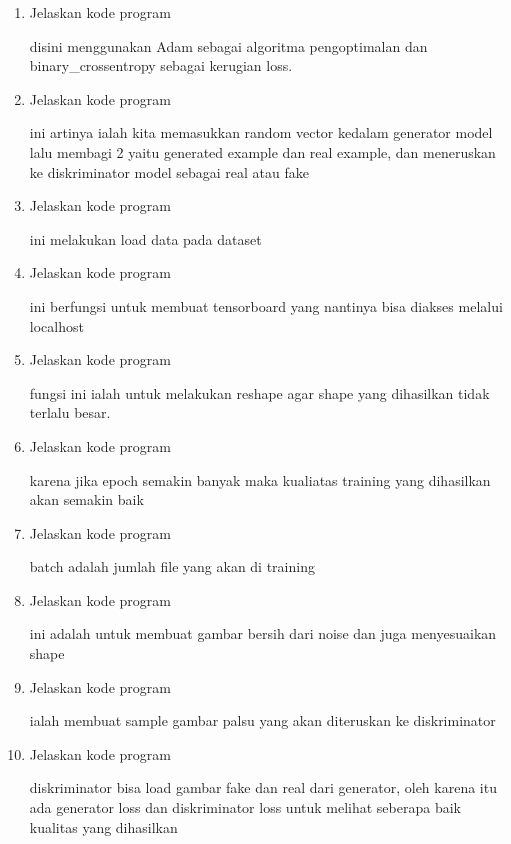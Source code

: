 \begin{enumerate}
        \item Jelaskan kode program 
        
        disini menggunakan Adam sebagai algoritma pengoptimalan dan binary\_crossentropy sebagai kerugian loss. 
        
        \item Jelaskan kode program 
        
        ini artinya ialah kita memasukkan random vector kedalam generator model lalu membagi 2 yaitu generated example dan real example, dan meneruskan ke diskriminator model sebagai real atau fake
        
        \item Jelaskan kode program 
        
        ini melakukan load data pada dataset
        
        \item Jelaskan kode program 
        
        ini berfungsi untuk membuat tensorboard yang nantinya bisa diakses melalui localhost
        
        \item Jelaskan kode program 
        
        fungsi ini ialah untuk melakukan reshape agar shape yang dihasilkan tidak terlalu besar.
        
        \item Jelaskan kode program 
        
        karena jika epoch semakin banyak maka kualiatas training yang dihasilkan akan semakin baik
        
        \item Jelaskan kode program 
        
        batch adalah jumlah file yang akan di training
        
        \item Jelaskan kode program 
        
        ini adalah untuk membuat gambar bersih dari noise dan juga menyesuaikan shape
        
        \item Jelaskan kode program 
        
        ialah membuat sample gambar palsu yang akan diteruskan ke diskriminator
        
        \item Jelaskan kode program 
        
        diskriminator bisa load gambar fake dan real dari generator, oleh karena itu ada generator loss dan diskriminator loss untuk melihat seberapa baik kualitas yang dihasilkan
        

\end{enumerate}

